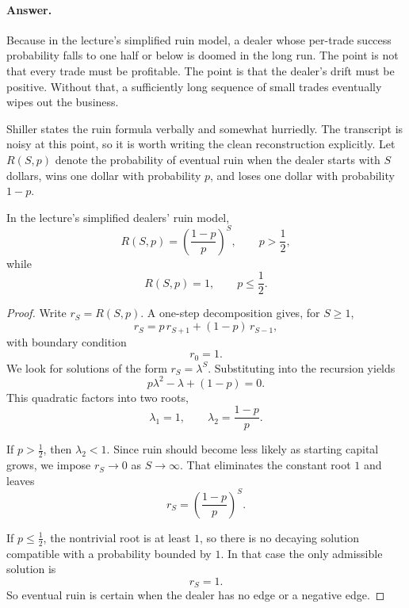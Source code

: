 \paragraph{Answer.} Because in the lecture's simplified ruin model, a dealer whose per-trade success probability falls to one half or below is doomed in the long run. The point is not that every trade must be profitable. The point is that the dealer's drift must be positive. Without that, a sufficiently long sequence of small trades eventually wipes out the business.

Shiller states the ruin formula verbally and somewhat hurriedly. The transcript is noisy at this point, so it is worth writing the clean reconstruction explicitly. Let \(R(S,p)\) denote the probability of eventual ruin when the dealer starts with \(S\) dollars, wins one dollar with probability \(p\), and loses one dollar with probability \(1-p\).

\begin{proposition}
In the lecture's simplified dealers' ruin model,
\begin{equation}
R(S,p)=\left(\frac{1-p}{p}\right)^S,
\qquad p>\frac12,
\end{equation}
while
\begin{equation}
R(S,p)=1,
\qquad p\le \frac12.
\end{equation}
\end{proposition}

\begin{proof}
Write \(r_S=R(S,p)\). A one-step decomposition gives, for \(S\ge 1\),
\begin{equation}
r_S = p\,r_{S+1} + (1-p)\,r_{S-1},
\end{equation}
with boundary condition
\begin{equation}
r_0 = 1.
\end{equation}
We look for solutions of the form \(r_S=\lambda^S\). Substituting into the recursion yields
\begin{equation}
p\lambda^2-\lambda+(1-p)=0.
\end{equation}
This quadratic factors into two roots,
\begin{equation}
\lambda_1 = 1,
\qquad
\lambda_2 = \frac{1-p}{p}.
\end{equation}

If \(p>\frac12\), then \(\lambda_2<1\). Since ruin should become less likely as starting capital grows, we impose \(r_S \to 0\) as \(S\to\infty\). That eliminates the constant root \(1\) and leaves
\begin{equation}
r_S=\left(\frac{1-p}{p}\right)^S.
\end{equation}

If \(p\le \frac12\), the nontrivial root is at least \(1\), so there is no decaying solution compatible with a probability bounded by \(1\). In that case the only admissible solution is
\begin{equation}
r_S=1.
\end{equation}
So eventual ruin is certain when the dealer has no edge or a negative edge.
\end{proof}

